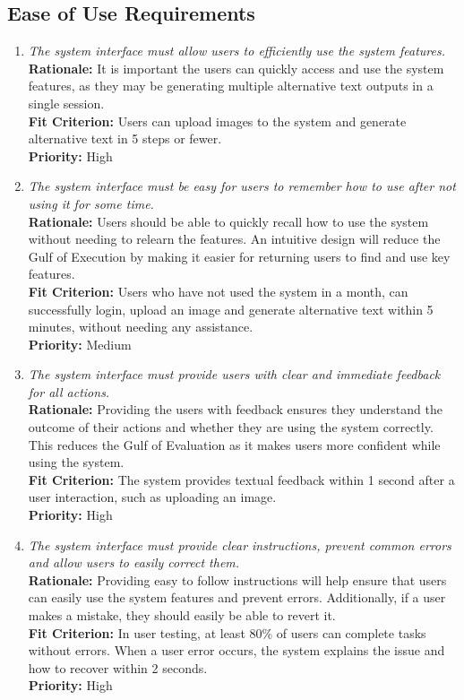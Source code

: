 \documentclass[12pt]{article}
\begin{document}
\subsection{Ease of Use Requirements}
\begin{enumerate}[label=UHR-EUR \arabic*., wide=0pt, leftmargin=*]
\item \emph{The system interface must allow users to efficiently use the system features.}\\[2mm] 
    {\bf Rationale:} It is important the users can quickly access and use the system features, as they may be generating multiple alternative text outputs in a single session. \\
    {\bf Fit Criterion:} Users can upload images to the system and generate alternative text in 5 steps or fewer. \\
    {\bf Priority:} High
\item \emph{The system interface must be easy for users to remember how to use after not using it for some time.}\\[2mm] 
    {\bf Rationale:} Users should be able to quickly recall how to use the system without needing to relearn the features. An intuitive design will reduce the Gulf of Execution by making it easier for returning users to find and use key features.  \\
    {\bf Fit Criterion:} Users who have not used the system in a month, can successfully login, upload an image and generate alternative text within 5 minutes, without needing any assistance. \\
    {\bf Priority:} Medium
\item \emph{The system interface must provide users with clear and immediate feedback for all actions.}\\[2mm] 
    {\bf Rationale:} Providing the users with feedback ensures they understand the outcome of their actions and whether they are using the system correctly. This reduces the Gulf of Evaluation as it makes users more confident while using the system. \\
    {\bf Fit Criterion:} The system provides textual feedback within 1 second after a user interaction, such as uploading an image.  \\
    {\bf Priority:} High 
\item \emph{The system interface must provide clear instructions, prevent common errors and allow users to easily correct them.}\\[2mm] 
    {\bf Rationale:} Providing easy to follow instructions will help ensure that users can easily use the system features and prevent errors. Additionally, if a user makes a mistake, they should easily be able to revert it.  \\
    {\bf Fit Criterion:} In user testing, at least 80\% of users can complete tasks without errors. When a user error occurs, the system explains the issue and how to recover within 2 seconds.\\
    {\bf Priority:} High 
\end{enumerate}
\end{document}

